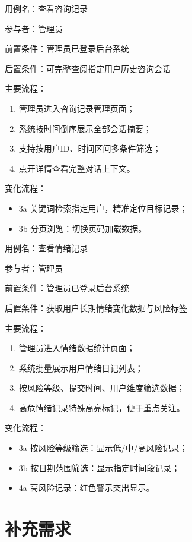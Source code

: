 \par
\indent 用例名：查看咨询记录
\par
\indent 参与者：管理员
\par
\indent 前置条件：管理员已登录后台系统
\par
\indent 后置条件：可完整查阅指定用户历史咨询会话
\par
\indent 主要流程：
\begin{enumerate}
    \item 管理员进入咨询记录管理页面；
    \item 系统按时间倒序展示全部会话摘要；
    \item 支持按用户ID、时间区间多条件筛选；
    \item 点开详情查看完整对话上下文。
\end{enumerate}
\par
\indent 变化流程：
\begin{itemize}
    \item 3a 关键词检索指定用户，精准定位目标记录；
    \item 3b 分页浏览：切换页码加载数据。
\end{itemize}

\par
\indent 用例名：查看情绪记录
\par
\indent 参与者：管理员
\par
\indent 前置条件：管理员已登录后台系统
\par
\indent 后置条件：获取用户长期情绪变化数据与风险标签
\par
\indent 主要流程：
\begin{enumerate}
    \item 管理员进入情绪数据统计页面；
    \item 系统批量展示用户情绪日记列表；
    \item 按风险等级、提交时间、用户维度筛选数据；
    \item 高危情绪记录特殊高亮标记，便于重点关注。
\end{enumerate}
\par
\indent 变化流程：
\begin{itemize}
    \item 3a 按风险等级筛选：显示低/中/高风险记录；
    \item 3b 按日期范围筛选：显示指定时间段记录；
    \item 4a 高风险记录：红色警示突出显示。
\end{itemize}

\section{补充需求}
